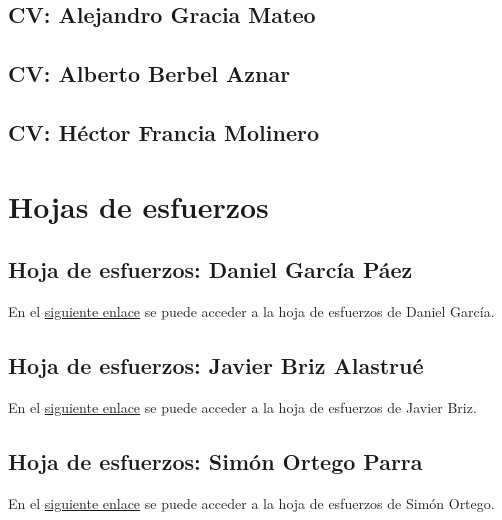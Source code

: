 \documentclass[10pt,spanish]{article}
\let\stdsection\section
\renewcommand\section{\newpage\stdsection}
\newcommand{\hojaesfuerzos}[2]{\href{run:../../recopilacion_esfuerzos/#1.xls}{#2}}
\begin{document}
\subsection{CV: Alejandro Gracia Mateo}

\newpage

\subsection{CV: Alberto Berbel Aznar}

\newpage

\subsection{CV: Héctor Francia Molinero}

\newpage


\section{Hojas de esfuerzos}\label{sec:hojas_esfuerzos}
%
%
\subsection{Hoja de esfuerzos: Daniel García Páez}
%
En el \hojaesfuerzos{daniel_recopilacion_esfuerzos}{siguiente enlace} se puede acceder a la hoja de 
esfuerzos de Daniel García.

\subsection{Hoja de esfuerzos: Javier Briz Alastrué}
%
En el \hojaesfuerzos{javier_recopilacion_esfuerzos}{siguiente enlace} se puede acceder a la hoja de 
esfuerzos de Javier Briz.

\subsection{Hoja de esfuerzos: Simón Ortego Parra}
%
En el \hojaesfuerzos{simon_recopilacion_esfuerzos}{siguiente enlace} se puede acceder a la hoja de 
esfuerzos de Simón Ortego.
\end{document}

